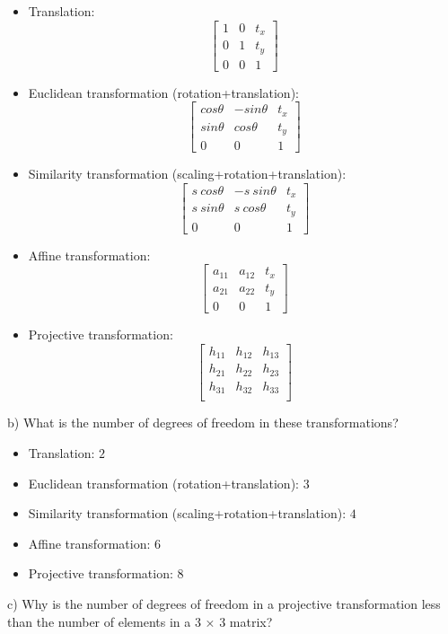 \documentclass[letterpaper, 11pt]{article}
\begin{document}
\begin{itemize}
    \item Translation:
          $$\begin{bmatrix}
                  1 & 0 & t_x \\
                  0 & 1 & t_y \\
                  0 & 0 & 1
              \end{bmatrix}$$
    \item Euclidean transformation (rotation+translation):
          $$\begin{bmatrix}
                  cos\theta & -sin\theta & t_x \\
                  sin\theta & cos\theta  & t_y \\
                  0         & 0          & 1
              \end{bmatrix}$$
    \item Similarity transformation (scaling+rotation+translation):
          $$\begin{bmatrix}
                  s\ cos\theta & -s\ sin\theta & t_x \\
                  s\ sin\theta & s\ cos\theta  & t_y \\
                  0            & 0             & 1
              \end{bmatrix}$$
    \item Affine transformation:
          $$\begin{bmatrix}
                  a_{11} & a_{12} & t_x \\
                  a_{21} & a_{22} & t_y \\
                  0      & 0      & 1
              \end{bmatrix}$$
    \item Projective transformation:
          $$\begin{bmatrix}
                  h_{11} & h_{12} & h_{13} \\
                  h_{21} & h_{22} & h_{23} \\
                  h_{31} & h_{32} & h_{33} \\
              \end{bmatrix}$$
\end{itemize}
b) What is the number of degrees of freedom in these transformations?
\begin{itemize}
    \item Translation:
          $2$
    \item Euclidean transformation (rotation+translation):
          $3$
    \item Similarity transformation (scaling+rotation+translation):
          $4$
    \item Affine transformation:
          $6$
    \item Projective transformation:
          $8$
\end{itemize}
c) Why is the number of degrees of freedom in a projective transformation less than the
number of elements in a 3 × 3 matrix?
\end{document}
